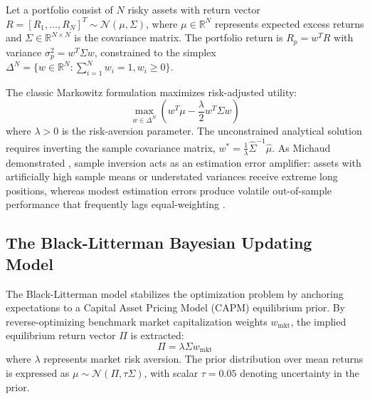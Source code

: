 \documentclass[conference]{IEEEtran}
\begin{document}
Let a portfolio consist of $N$ risky assets with return vector $R = [R_1, \dots, R_N]^T \sim \mathcal{N}(\mu, \Sigma)$, where $\mu \in \mathbb{R}^N$ represents expected excess returns and $\Sigma \in \mathbb{R}^{N \times N}$ is the covariance matrix. The portfolio return is $R_p = w^T R$ with variance $\sigma_p^2 = w^T \Sigma w$, constrained to the simplex $\Delta^N = \{w \in \mathbb{R}^N : \sum_{i=1}^N w_i = 1, w_i \ge 0\}$.

The classic Markowitz formulation \cite{markowitz1952} maximizes risk-adjusted utility:
\begin{equation}
\max_{w \in \Delta^N} \left( w^T \mu - \frac{\lambda}{2} w^T \Sigma w \right)
\label{eq:markowitz}
\end{equation}
where $\lambda > 0$ is the risk-aversion parameter. The unconstrained analytical solution requires inverting the sample covariance matrix, $w^* = \frac{1}{\lambda} \hat{\Sigma}^{-1} \hat{\mu}$. As Michaud demonstrated \cite{michaud1989}, sample inversion acts as an estimation error amplifier: assets with artificially high sample means or understated variances receive extreme long positions, whereas modest estimation errors produce volatile out-of-sample performance that frequently lags equal-weighting \cite{demiguel2009}.

\subsection{The Black-Litterman Bayesian Updating Model}

The Black-Litterman model \cite{black1992, he1999} stabilizes the optimization problem by anchoring expectations to a Capital Asset Pricing Model (CAPM) equilibrium prior. By reverse-optimizing benchmark market capitalization weights $w_{\text{mkt}}$, the implied equilibrium return vector $\Pi$ is extracted:
\begin{equation}
\Pi = \lambda \Sigma w_{\text{mkt}}
\label{eq:bl_prior}
\end{equation}
where $\lambda$ represents market risk aversion. The prior distribution over mean returns is expressed as $\mu \sim \mathcal{N}(\Pi, \tau \Sigma)$, with scalar $\tau = 0.05$ denoting uncertainty in the prior.
\end{document}
